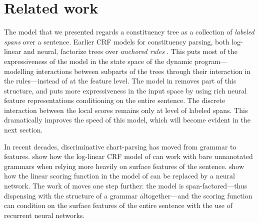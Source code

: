 
\section{Related work}
  The model that we presented regards a constituency tree as a collection of \textit{labeled spans} over a sentence. Earlier CRF models for constituency parsing, both log-linear and neural, factorize trees over \textit{anchored rules} \citep{finkel2008crf,klein2015crf}. This puts most of the expressiveness of the model in the state space of the dynamic program---modelling interactions between subparts of the trees through their interaction in the rules---instead of at the feature level. The model in \citet{stern2017minimal} removes part of this structure, and puts more expressiveness in the input space by using rich neural feature representations conditioning on the entire sentence. The discrete interaction between the local scores remains only at level of labeled spans. This dramatically improves the speed of this model, which will become evident in the next section.

  In recent decades, discriminative chart-parsing has moved from grammar to features. \citet{hall2014less} show how the log-linear CRF model of \cite{finkel2008crf} can work with bare unnanotated grammars when relying more heavily on surface features of the sentence. \citet{klein2015crf} show how the linear scoring function in the model of \citet{hall2014less} can be replaced by a neural network. The work of \citep{stern2017minimal} moves one step further: the model is span-factored---thus dispensing with the structure of a grammar altogether---and the scoring function can condition on the surface features of the entire sentence with the use of recurrent neural networks.

